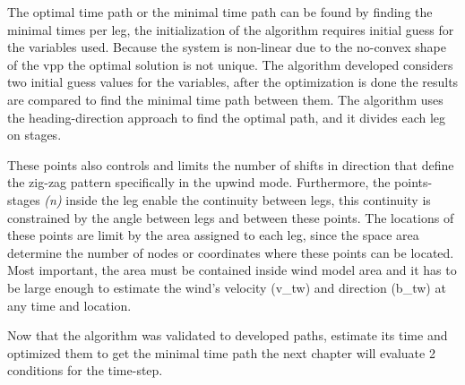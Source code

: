 The optimal time path or the minimal time path can be found by finding the minimal times per leg, the initialization of the algorithm requires initial guess for the variables used. Because the system is non-linear due to the no-convex shape of the \acrshort{vpp} the optimal solution is not unique. The algorithm developed considers two initial guess values for the variables, after the optimization is done the results are compared to find the minimal time path between them.  
The algorithm uses the heading-direction approach to find the optimal path, and it divides each leg on stages. \par 
\noindent
These points also controls and limits the number of shifts in direction that define the zig-zag pattern specifically in the upwind mode. %
Furthermore, the points-stages \textit{(n)} inside the leg enable the continuity between legs, this continuity is constrained by the angle between legs and between these points. The locations of these points are limit by the area assigned to each leg, since the space area determine the number of nodes or coordinates where these points can be located. Most important, the area must be contained inside wind model area and it has to be large enough to estimate the wind's velocity (\acrshort{v_tw}) and direction (\acrshort{b_tw}) at any time and location. 
\par Now that the algorithm was validated to developed paths, estimate its time and optimized them to get the minimal time path the next chapter will evaluate 2 conditions for the time-step. 









